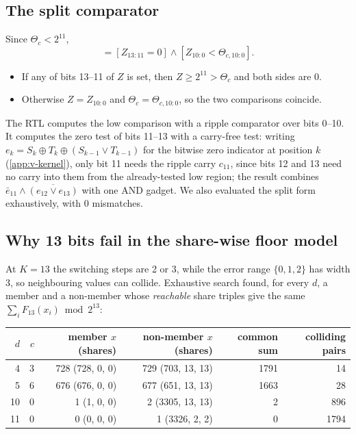 \subsection{The split comparator}\label{app:math-split}
Since $\Theta_c < 2^{11}$,
\begin{equation}
  [Z < \Theta_c] = [Z_{13:11} = 0] \wedge [Z_{10:0} < \Theta_{c,10:0}] .
\end{equation}
\begin{itemize}
  \item If any of bits 13--11 of $Z$ is set, then $Z \ge 2^{11} > \Theta_c$ and both sides are 0.
  \item Otherwise $Z = Z_{10:0}$ and $\Theta_c = \Theta_{c,10:0}$, so the two comparisons coincide.
\end{itemize}
The RTL computes the low comparison with a ripple comparator over bits 0--10. It computes the zero test of bits 11--13 with a carry-free test: writing $e_k = S_k \oplus T_k \oplus (S_{k-1} \vee T_{k-1})$ for the bitwise zero indicator at position $k$ (\cref{app:v-kernel}), only bit 11 needs the ripple carry $c_{11}$, since bits 12 and 13 need no carry into them from the already-tested low region; the result combines $\bar e_{11} \wedge \overline{(e_{12} \vee e_{13})}$ with one AND gadget. We also evaluated the split form exhaustively, with 0 mismatches.

\subsection{Why 13 bits fail in the share-wise floor model}\label{app:math-k13}
At $K = 13$ the switching steps are 2 or 3, while the error range $\{0, 1, 2\}$ has width 3, so neighbouring values can collide. Exhaustive search found, for every $d$, a member and a non-member whose \emph{reachable} share triples give the same $\sum_i F_{13}(x_i) \bmod 2^{13}$:

\begin{center}\small
\begin{tabular}{@{}rrrrrr@{}}
\toprule
$d$ & $c$ & member $x$ (shares) & non-member $x$ (shares) & common sum & colliding pairs \\
\midrule
4 & 3 & 728 (728, 0, 0) & 729 (703, 13, 13) & 1791 & 14 \\
5 & 6 & 676 (676, 0, 0) & 677 (651, 13, 13) & 1663 & 28 \\
10 & 0 & 1 (1, 0, 0) & 2 (3305, 13, 13) & 2 & 896 \\
11 & 0 & 0 (0, 0, 0) & 1 (3326, 2, 2) & 0 & 1794 \\
\bottomrule
\end{tabular}
\end{center}

